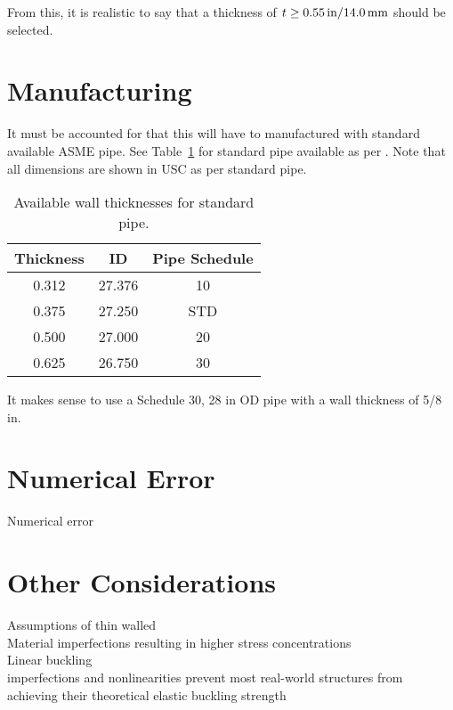 From this, it is realistic to say that a thickness of $t\geq 0.55 \,\mathrm{in}/14.0\,\mathrm{mm}$ should be selected. 

\section{Manufacturing}

It must be accounted for that this will have to manufactured with standard available ASME pipe. See Table~\ref{table:5_pipe} for standard pipe available as per \cite{PIPEINFO}. Note that all dimensions are shown in USC as per standard pipe.

\begin{table}[H]
	\caption[Available wall thicknesses for standard pipe.]{Available wall thicknesses for standard pipe.\protect\cite{PIPEINFO}}
	\centering
	\begin{tabular}{ccc}
    \textbf{Thickness} & \textbf{ID} & \textbf{Pipe Schedule} \\
    \midrule
    0.312 & 27.376 & 10 \\
    0.375 & 27.250 & STD \\
    0.500 & 27.000 & 20 \\
    0.625 & 26.750 & 30 \\
    \end{tabular}%
	\label{table:5_pipe}
\end{table}

It makes sense to use a Schedule 30, 28 in OD pipe with a wall thickness of 5/8 in.

\section{Numerical Error}
Numerical error\\


\section{Other Considerations}
Assumptions of thin walled\\

Material imperfections resulting in higher stress concentrations\\

Linear buckling\\
imperfections and nonlinearities prevent most real-world structures from achieving their theoretical elastic buckling strength\\

